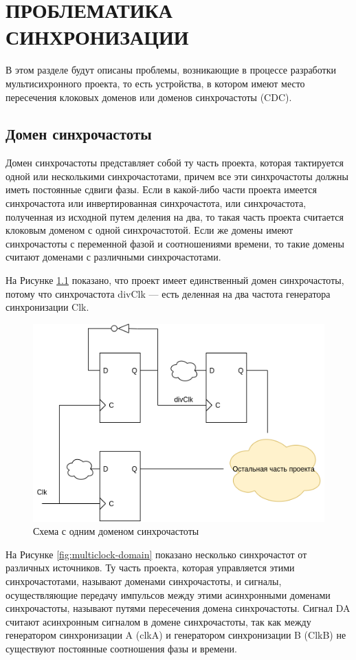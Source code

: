 \chapter{ПРОБЛЕМАТИКА СИНХРОНИЗАЦИИ}

В этом разделе будут описаны проблемы, возникающие в процессе разработки мультисихронного проекта, то есть устройства, в котором имеют место пересечения клоковых доменов или доменов синхрочастоты (CDC).

\section{Домен синхрочастоты}
Домен синхрочастоты представляет собой ту часть проекта, которая тактируется одной или несколькими синхрочастотами, причем все эти синхрочастоты должны иметь постоянные сдвиги фазы. Если в какой-либо части проекта имеется синхрочастота или инвертированная синхрочастота, или синхрочастота, полученная из исходной путем деления на два, то такая часть проекта считается клоковым доменом с одной синхрочастотой. Если же домены имеют синхрочастоты с переменной фазой и соотношениями времени, то такие домены считают доменами с различными синхрочастотами. 

На Рисунке \ref{fig:clock-domain} показано, что проект имеет единственный домен синхрочастоты, потому что синхрочастота divClk --- есть деленная на два частота генератора синхронизации Clk.

\begin{figure}[h!]
	\centering
	\includegraphics[width=0.5\linewidth]{course-scheme/images/clock-domain}
	\caption{Схема с одним доменом синхрочастоты}
	\label{fig:clock-domain}
\end{figure}


На Рисунке \ref{fig:multiclock-domain} показано несколько синхрочастот от различных источников. Ту часть проекта, которая управляется этими синхрочастотами, называют доменами синхрочастоты, и сигналы, осуществляющие передачу импульсов между этими асинхронными доменами синхрочастоты, называют путями пересечения домена синхрочастоты. Сигнал DA считают асинхронным сигналом в домене синхрочастоты, так как между генератором синхронизации A (clkA) и генератором синхронизации B (ClkB) не существуют постоянные соотношения фазы и времени. 




